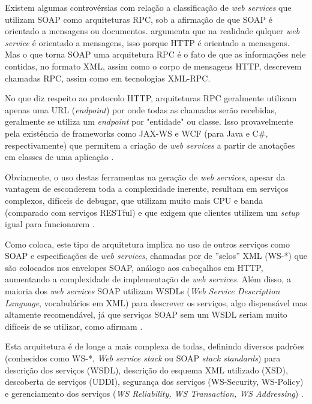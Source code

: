 \documentclass[diss]{template/setrem}
\begin{document}
Existem algumas controvérsias com relação a classificação de \emph{web services} que utilizam SOAP como arquiteturas RPC, sob a afirmação de que SOAP é orientado a mensagens ou documentos. \citet{Richardson2007} argumenta que na realidade qulquer \emph{web service} é orientado a mensagens, isso porque HTTP é orientado a mensagens. Mas o que torna SOAP uma arquitetura RPC é o fato de que as informações nele contidas, no formato XML, assim como o corpo de mensagens HTTP, descrevem chamadas RPC, assim como em tecnologias XML-RPC.

No que diz respeito ao protocolo HTTP, arquiteturas RPC geralmente utilizam apenas uma URL (\emph{endpoint}) por onde todas as chamadas serão recebidas, geralmente se utiliza um \emph{endpoint} por "entidade" ou classe. Isso provavelmente pela existência de frameworks como JAX-WS e WCF (para Java e C\#, respectivamente) que permitem a criação de \emph{web services} a partir de anotações em classes de uma aplicação \citep{Daigneau2010, Bell2009}.

Obviamente, o uso destas ferramentas na geração de \emph{web services}, apesar da vantagem de esconderem toda a complexidade inerente, resultam em serviços complexos, difíceis de debugar, que utilizam muito mais CPU e banda (comparado com serviços RESTful) e que exigem que clientes utilizem um \emph{setup} igual para funcionarem \citep{Richardson2007}.

Como \citet{Bell2009} coloca, este tipo de arquitetura implica no uso de outros serviços como SOAP e especificações de \emph{web services}, chamadas por \citet{Richardson2007} de ''selos'' XML (WS-*) que são colocados nos envelopes SOAP, análogo aos cabeçalhos em HTTP, aumentando a complexidade de implementação de \emph{web services}. Além disso, a maioria dos \emph{web services} SOAP utilizam WSDLs (\emph{Web Service Description Language}, vocabulários em XML) para descrever os serviços, algo dispensável mas altamente recomendável, já que serviços SOAP sem um WSDL seriam muito difíceis de se utilizar, como afirmam \citep{Richardson2007}.

Esta arquitetura é de longe a mais complexa de todas, definindo diversos padrões (conhecidos como WS-*, \emph{Web service stack} ou SOAP \emph{stack standards}) para descrição dos serviços (WSDL), descrição do esquema XML utilizado (XSD), descoberta de serviços (UDDI), segurança dos serviços (WS-Security, WS-Policy) e gerenciamento dos serviços (\emph{WS Reliability, WS Transaction, WS Addressing}) \citep{Bean2010}.
\end{document}
